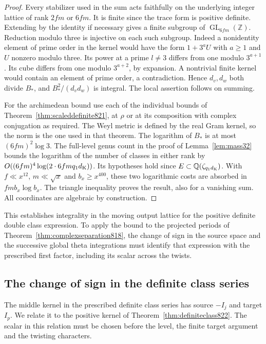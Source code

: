 \documentclass[a4paper,11pt]{article}
\theoremstyle{definition}
\theoremstyle{remark}
\newcommand{\ZZ}{\mathbb Z}\newcommand{\ord}{\operatorname{ord}}
\numberwithin{equation}{section}
\begin{document}
\begin{proof}
Every stabilizer used in the sum acts faithfully on the
underlying integer lattice of rank \(2fm\) or \(6fm\).
It is finite since the trace form is positive definite.
Extending by the identity if necessary gives a finite subgroup
of \(\operatorname{GL}_{6fm}(\ZZ)\). Reduction modulo three
is injective on each such subgroup. Indeed a nonidentity element
of prime order in the kernel would have the form \(1+3^a U\)
with \(a\ge1\) and \(U\) nonzero modulo three. Its power at
a prime \(l\ne3\) differs from one modulo \(3^{a+1}\).
Its cube differs from one modulo \(3^{a+2}\), by expansion.
A nontrivial finite kernel would contain an element of prime
order, a contradiction. Hence \(d_v,d_w\) both divide \(B_*\),
and \(B_*^2/(d_vd_w)\) is integral. The local assertion
follows on summing.

For the archimedean bound use each of the individual bounds
of Theorem~\ref{thm:scaleddefinite821}, at \(\rho\) or at its
composition with complex conjugation as required. The Weyl
metric is defined by the real Gram kernel, so the norm is the
one used in that theorem. The logarithm of \(B_*\) is at most
\((6fm)^2\log3\). The full-level genus count in the proof
of Lemma~\ref{lem:mass32} bounds the logarithm of the number
of classes in either rank by
\(O((6fm)^4\log(2\cdot 6fm q_1d_{\rm K}))\). Its hypotheses
hold since \(E\subset\mathbb Q(\zeta_{q_1d_{\rm K}})\).
With \(f\ll x^{12}\), \(m\ll\sqrt x\) and \(b_x\ge x^{400}\),
these two logarithmic costs are absorbed in \(f m b_x\log b_x\).
The triangle inequality proves the result, also for a vanishing
sum. All coordinates are algebraic by construction.
\end{proof}

This establishes integrality in the moving output lattice for
the positive definite double class expression. To apply the
bound to the projected periods of
Theorem~\ref{thm:complexseparation818}, the change of sign in
the source space and the successive global theta integrations
must identify that expression with the prescribed first factor,
including its scalar across the twists.
\clearpage

\subsection{The change of sign in the definite class series}
\label{sec:signeddefinite823}
The middle kernel in the prescribed definite class series has
source \(-I_j\) and target \(I_p\). We relate it to the positive
kernel of Theorem~\ref{thm:definiteclass822}. The scalar in this
relation must be chosen before the level, the finite target
argument and the twisting characters.
\end{document}
